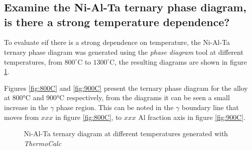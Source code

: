 \newpage
\section{}

\subsection{Examine the Ni-Al-Ta ternary phase diagram, is there a strong temperature dependence?}

To evaluate eif there is a strong dependence on temperature, the Ni-Al-Ta ternary phase diagram was generated using the \textit{phase diagram} tool at different temperatures, from $800^{\circ}$C to $1300^{\circ}$C, the resulting diagrams are shown in figure \ref{fig:diagram02}.

Figures \ref{fig:800C} and \ref{fig:900C} present the ternary phase diagram for the alloy at $800$°C and $900$°C respectively, from the diagrams it can be seen a small increase in the $\gamma$ phase  region. This can be noted in the $\gamma$ boundary line that moves from $xxx$ in figure \ref{fig:800C}, to $xxx$ Al fraction axis in figure \ref{fig:900C}.

\begin{figure}[h]
  \centering
  \caption{Ni-Al-Ta ternary diagram at different temperatures generated with \textit{ThermoCalc} \citep{thermocalc}}
  \label{fig:diagram02}
\end{figure}

